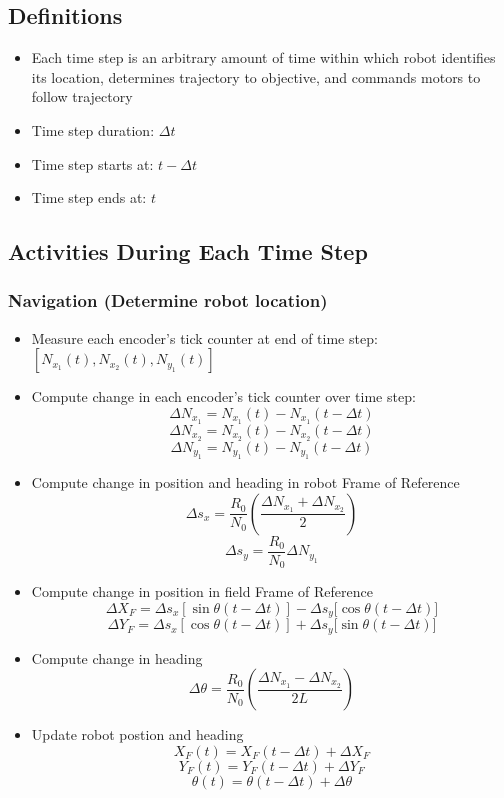 \subsection{Definitions}
\label{definitions}

\begin{itemize}
\item Each time step is an arbitrary amount of time within which robot identifies its location, determines trajectory to objective, and commands motors to follow trajectory

\item Time step duration: \(\Delta t\)

\item Time step starts at: \(t - \Delta t\)

\item Time step ends at: \(t\)

\end{itemize}

\subsection{Activities During Each Time Step}
\label{activitiesduringeachtimestep}

\subsubsection{Navigation (Determine robot location)}
\label{navigationdeterminerobotlocation}

\begin{itemize}
\item Measure each encoder's tick counter at end of time step: \([N_{x_1} (t), N_{x_2} (t), N_{y_1} (t)]\)

\item Compute change in each encoder's tick counter over time step:
\[\Delta N_{x_1} = N_{x_1} (t) - N_{x_1} (t - \Delta t)\]
\[\Delta N_{x_2} = N_{x_2} (t) - N_{x_2} (t - \Delta t)\]
\[\Delta N_{y_1} = N_{y_1} (t) - N_{y_1} (t - \Delta t)\]

\item Compute change in position and heading in robot Frame of Reference
\[\Delta s_x = \frac{R_0}{N_0} \left( \frac{\Delta N_{x_1} + \Delta N_{x_2}}{2} \right)\]
\[\Delta s_y = \frac{R_0}{N_0} \Delta N_{y_1}\]

\item Compute change in position in field Frame of Reference
\[\Delta X_F = \Delta s_x [\sin{\theta (t - \Delta t)}] - \Delta s_y [\cos{\theta (t - \Delta t)]}\]
\[\Delta Y_F = \Delta s_x [\cos{\theta (t - \Delta t)}] + \Delta s_y [\sin{\theta (t - \Delta t)]}\]

\item Compute change in heading
\[\Delta \theta = \frac{R_0}{N_0} \left( \frac{\Delta N_{x_1} - \Delta N_{x_2}}{2L} \right)\]

\item Update robot postion and heading
\[X_F(t) = X_F(t - \Delta t) + \Delta X_F\]
\[Y_F(t) = Y_F(t - \Delta t) + \Delta Y_F\]
\[\theta (t) = \theta (t - \Delta t) + \Delta \theta \]

\end{itemize}

